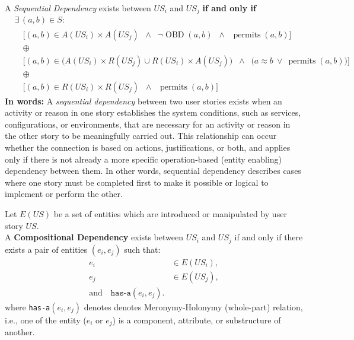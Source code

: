 \documentclass[a4paper, 11 pt, leqno, titlepage = true, toc=bib, oneside]{scrbook}
\begin{document}
\begin{defin}
    A \textit{Sequential Dependency} exists between $US_i$ and $US_j$ \textbf{if and only if}
    \[
        \begin{aligned}
             & \exists\, (a, b) \in S:\                                                                                                                                              \\
             & \quad \big[ (a, b) \in A(US_i) \times A(US_j)\;\; \land\;\; \neg \operatorname{OBD}(a, b)\;\; \land\;\; \operatorname{permits}(a, b) \big]                            \\
             & \quad \oplus                                                                                                                                                          \\
             & \quad \big[ (a, b) \in \big( A(US_i) \times R(US_j) \cup R(US_i) \times A(US_j) \big)\;\; \land\;\; \big( a \approx b\ \lor\ \operatorname{permits}(a, b) \big) \big] \\
             & \quad \oplus                                                                                                                                                          \\
             & \quad \big[ (a, b) \in R(US_i) \times R(US_j)\;\; \land\;\; \operatorname{permits}(a, b) \big]
        \end{aligned}
    \]
    \textbf{In words: } A \textit{sequential dependency} between two user stories exists when an activity or reason in one story establishes the system conditions, such as services, configurations, or environments, that are necessary for an activity or reason in the other story to be meaningfully carried out. This relationship can occur whether the connection is based on actions, justifications, or both, and applies only if there is not already a more specific operation-based (entity enabling) dependency between them. In other words, sequential dependency describes cases where one story must be completed first to make it possible or logical to implement or perform the other.
\end{defin}


\begin{defin} 
    Let $E(US)$ be a set of entities which are introduced or manipulated by user story $US$. \\
    A \textbf{Compositional Dependency} exists between \( US_i \) and \( US_j \) if and only if there exists a pair of entities \( (e_i, e_j) \) such that:
    \begin{align*}
        e_i & \in E(US_i), \\
        e_j & \in E(US_j), \\
        \text{and} \quad \texttt{has-a}(e_i, e_j).
    \end{align*}
    where \texttt{has-a}$(e_i, e_j)$ denotes denotes Meronymy-Holonymy (whole-part) relation, i.e., one of the entity ($e_i \text{ or } e_j$) is a component, attribute, or substructure of another.
\end{defin}
\end{document}

